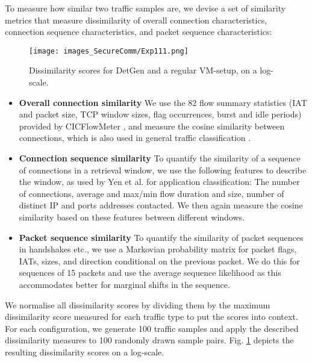 To measure how similar two traffic samples are, we devise a set of similarity metrics that measure dissimilarity of overall connection characteristics, connection sequence characteristics, and packet sequence characteristics:


\begin{figure}
\centering
\texttt{[image: images\_SecureComm/Exp111.png]}
\caption{Dissimilarity scores for DetGen and a regular VM-setup, on a log-scale.}\label{Fig:determ-metric}
\end{figure}

\begin{itemize}
\item \textbf{Overall connection similarity} We use the 82 flow summary statistics (IAT and packet size, TCP window sizes, flag occurrences, burst and idle periods) provided by CICFlowMeter \cite{lashkari2017characterization}, and measure the cosine similarity between connections, which is also used in general traffic classification \cite{aun2017review}.
\item \textbf{Connection sequence similarity} 
To quantify the similarity of a sequence of connections in a retrieval window, we use the following features to describe the window, as used by Yen et al. \cite{yen2009browser} for application classification: The number of connections, average and max/min flow duration and size, number of distinct IP and ports addresses contacted. We then again measure the cosine similarity based on these features between different windows. 
\item \textbf{Packet sequence similarity} To quantify the similarity of packet sequences in handshakes etc., we use a Markovian probability matrix for packet flags, IATs, sizes, and direction conditional on the previous packet. We do this for sequences of 15 packets and use the average sequence likelihood as this accommodates better for marginal shifts in the sequence. %
\end{itemize}

We normalise all dissimilarity scores by dividing them by the maximum dissimilarity score measured for each traffic type to put the scores into context.
For each configuration, we generate 100 traffic samples and apply the described dissimilarity measures to 100 randomly drawn sample pairs. Fig. \ref{Fig:determ-metric} depicts the resulting dissimilarity scores on a log-scale.

